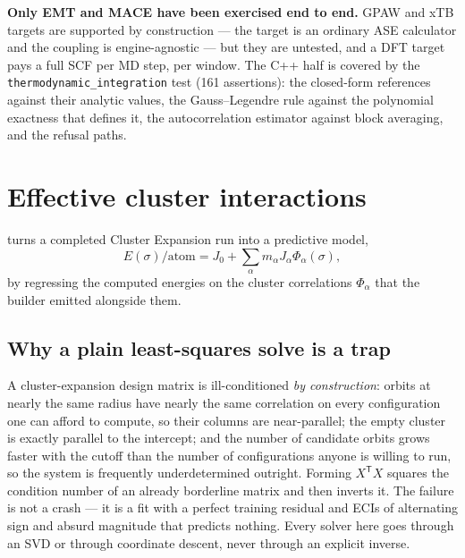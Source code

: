 \begin{calwarn}
\textbf{Only EMT and MACE have been exercised end to end.} GPAW and xTB targets
are supported by construction --- the target is an ordinary ASE calculator and
the coupling is engine-agnostic --- but they are untested, and a DFT target pays
a full SCF per MD step, per window. The C++ half is covered by the
\texttt{thermodynamic\_integration} test (161 assertions): the closed-form
references against their analytic values, the Gauss--Legendre rule against the
polynomial exactness that defines it, the autocorrelation estimator against
block averaging, and the refusal paths.
\end{calwarn}

\section{Effective cluster interactions}
\label{sec:eci}

\menusep{}\menusep{} turns a completed Cluster Expansion run into a predictive model,
\begin{equation}
  E(\sigma)/\text{atom}
    = J_0 + \sum_\alpha m_\alpha J_\alpha \Phi_\alpha(\sigma) ,
\end{equation}
by regressing the computed energies on the cluster correlations
$\Phi_\alpha$ that the builder emitted alongside them.

\subsection{Why a plain least-squares solve is a trap}

A cluster-expansion design matrix is ill-conditioned \emph{by construction}:
orbits at nearly the same radius have nearly the same correlation on every
configuration one can afford to compute, so their columns are near-parallel; the
empty cluster is exactly parallel to the intercept; and the number of candidate
orbits grows faster with the cutoff than the number of configurations anyone is
willing to run, so the system is frequently underdetermined outright. Forming
$X^{\mathsf T}X$ squares the condition number of an already borderline matrix
and then inverts it. The failure is not a crash --- it is a fit with a perfect
training residual and ECIs of alternating sign and absurd magnitude that
predicts nothing. Every solver here goes through an SVD or through coordinate
descent, never through an explicit inverse.

